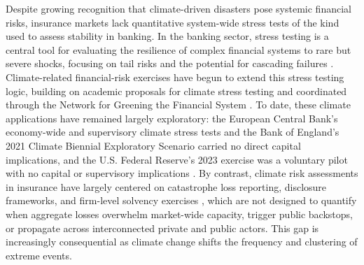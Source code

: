 \documentclass[fleqn,10pt]{wlscirep}
\begin{document}
Despite growing recognition that climate-driven disasters pose systemic financial risks, insurance markets lack quantitative system-wide stress tests of the kind used to assess stability in banking. In the banking sector, stress testing is a central tool for evaluating the resilience of complex financial systems to rare but severe shocks, focusing on tail risks and the potential for cascading failures \cite{BaselCommitteeonBankingSupervision2011, imf_macrofinancial_stress_testing_2012, fed_stress_tests_overview}. Climate-related financial-risk exercises have begun to extend this stress testing logic, building on academic proposals for climate stress testing \cite{battiston_climate_2017} and coordinated through the Network for Greening the Financial System \cite{ngfs_phase_v_2024}. To date, these climate applications have remained largely exploratory: the European Central Bank's economy-wide and supervisory climate stress tests \cite{dunzECBEconomyWideClimate2021, ecb_climate_stress_test_2022} and the Bank of England's 2021 Climate Biennial Exploratory Scenario \cite{boe_cbes_2022} carried no direct capital implications, and the U.S. Federal Reserve's 2023 exercise was a voluntary pilot with no capital or supervisory implications \cite{fed_pilot_csa_2024}. By contrast, climate risk assessments in insurance have largely centered on catastrophe loss reporting, disclosure frameworks, and firm-level solvency exercises \cite{swissre_sigma_2024_01, taskforceonclimate-relatedfinancialdisclosures_final_2017, naic_climate_risk_disclosure_survey, eiopa_insurance_stress_testing_climate_2022, wattinhakansson_single_2025}, which are not designed to quantify when aggregate losses overwhelm market-wide capacity, trigger public backstops, or propagate across interconnected private and public actors. This gap is increasingly consequential as climate change shifts the frequency and clustering of extreme events. \medskip
\end{document}
